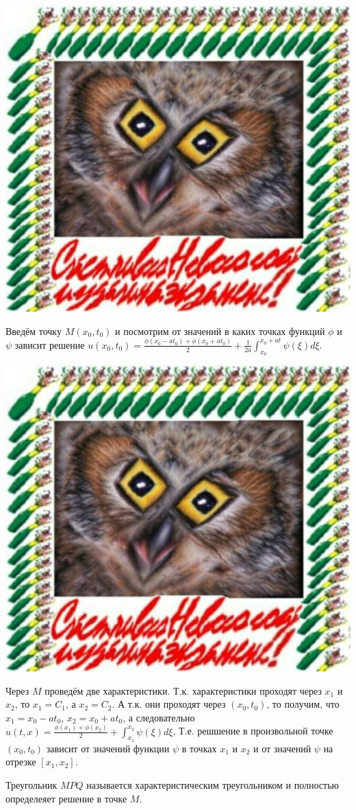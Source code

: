\documentclass[../main.tex]{subfiles}
\begin{document}
\includegraphics[scale=0.5]{example.jpg}

Введём точку $M(x_0, t_0)$ и посмотрим от значений в каких точках функций
$\phi$ и $\psi$ зависит решение $u(x_0, t_0) = \frac{\phi(x_0-at_0) + \phi(x_0+at_0)}{2} + \frac{1}{2a}\int_{x_0}^{x_0+at}\psi(\xi)d\xi$.

\includegraphics[scale=0.5]{example.jpg}

Через $M$ проведём две характеристики. Т.к. характеристики проходят через
$x_1$ и $x_2$, то $x_1 = C_1$, а $x_2 = C_2$.
А т.к. они проходят через $(x_0, t_0)$, то получим, что $x_1 = x_0 -at_0$, $x_2 = x_0 + at_0$,
а следовательно $u(t, x) = \frac{\phi(x_1) + \phi(x_2)}{2} + \int_{x_1}^{x_2}\psi(\xi)d\xi$,
Т.е. решшение в произвольной точке $(x_0, t_0)$ зависит от значений функции $\psi$
в точках $x_1$ и $x_2$ и от значений $\psi$ на отрезке $[x_1, x_2]$.

Треугольник $MPQ$ называется характеристическим треугольником и полностью определеяет решение в точке $M$.
\end{document}
